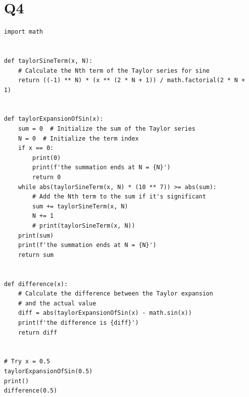 \documentclass{article}
\begin{document}
\section{Q4}

\begin{lstlisting}
import math


def taylorSineTerm(x, N):
    # Calculate the Nth term of the Taylor series for sine
    return ((-1) ** N) * (x ** (2 * N + 1)) / math.factorial(2 * N + 1)


def taylorExpansionOfSin(x):
    sum = 0  # Initialize the sum of the Taylor series
    N = 0  # Initialize the term index
    if x == 0:
        print(0)
        print(f'the summation ends at N = {N}')
        return 0
    while abs(taylorSineTerm(x, N) * (10 ** 7)) >= abs(sum):
        # Add the Nth term to the sum if it's significant
        sum += taylorSineTerm(x, N)
        N += 1
        # print(taylorSineTerm(x, N))
    print(sum)
    print(f'the summation ends at N = {N}')
    return sum


def difference(x):
    # Calculate the difference between the Taylor expansion 
    # and the actual value
    diff = abs(taylorExpansionOfSin(x) - math.sin(x))
    print(f'the difference is {diff}')
    return diff


# Try x = 0.5
taylorExpansionOfSin(0.5)
print()
difference(0.5)
\end{lstlisting}
\end{document}
